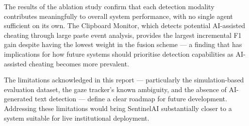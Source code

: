 The results of the ablation study confirm that each detection modality contributes meaningfully to overall system performance, with no single agent sufficient on its own. The Clipboard Monitor, which detects potential AI-assisted cheating through large paste event analysis, provides the largest incremental F1 gain despite having the lowest weight in the fusion scheme --- a finding that has implications for how future systems should prioritise detection capabilities as AI-assisted cheating becomes more prevalent.

The limitations acknowledged in this report --- particularly the simulation-based evaluation dataset, the gaze tracker's known ambiguity, and the absence of AI-generated text detection --- define a clear roadmap for future development. Addressing these limitations would bring SentinelAI substantially closer to a system suitable for live institutional deployment.

